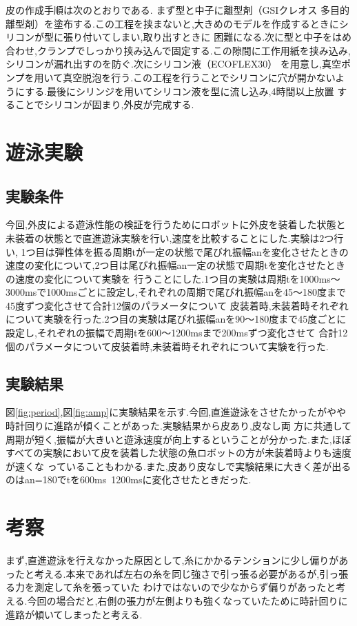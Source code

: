 \documentclass{jarticle}
\begin{document}
皮の作成手順は次のとおりである.
まず型と中子に離型剤（GSIクレオス 多目的離型剤）を塗布する.この工程を挟まないと,大きめのモデルを作成するときにシリコンが型に張り付いてしまい,取り出すときに
困難になる.次に型と中子をはめ合わせ,クランプでしっかり挟み込んで固定する.この隙間に工作用紙を挟み込み,シリコンが漏れ出すのを防ぐ.次にシリコン液（ECOFLEX30）
を用意し,真空ポンプを用いて真空脱泡を行う.この工程を行うことでシリコンに穴が開かないようにする.最後にシリンジを用いてシリコン液を型に流し込み,4時間以上放置
することでシリコンが固まり,外皮が完成する.

\section{遊泳実験}
\subsection{実験条件}
今回,外皮による遊泳性能の検証を行うためにロボットに外皮を装着した状態と未装着の状態とで直進遊泳実験を行い,速度を比較することにした.実験は2つ行い,
1つ目は弾性体を振る周期tが一定の状態で尾びれ振幅anを変化させたときの速度の変化について,2つ目は尾びれ振幅an一定の状態で周期tを変化させたときの速度の変化について実験を
行うことにした.1つ目の実験は周期tを1000ms～3000msで1000msごとに設定し,それぞれの周期で尾びれ振幅anを45～180度まで45度ずつ変化させて合計12個のパラメータについて
皮装着時,未装着時それぞれについて実験を行った.2つ目の実験は尾びれ振幅anを90～180度まで45度ごとに設定し,それぞれの振幅で周期tを600～1200msまで200msずつ変化させて
合計12個のパラメータについて皮装着時,未装着時それぞれについて実験を行った.

\subsection{実験結果}
図\ref{fig:period},図\ref{fig:amp}に実験結果を示す.今回,直進遊泳をさせたかったがやや時計回りに進路が傾くことがあった.実験結果から皮あり,皮なし両
方に共通して周期が短く,振幅が大きいと遊泳速度が向上するということが分かった.また,ほぼすべての実験において皮を装着した状態の魚ロボットの方が未装着時よりも速度が速くな
っていることもわかる.また,皮あり皮なしで実験結果に大きく差が出るのはan=180でtを600ms~1200msに変化させたときだった.

\section{考察}
まず,直進遊泳を行えなかった原因として,糸にかかるテンションに少し偏りがあったと考える.本来であれば左右の糸を同じ強さで引っ張る必要があるが,引っ張る力を測定して糸を張っていた
わけではないので少なからず偏りがあったと考える.今回の場合だと,右側の張力が左側よりも強くなっていたために時計回りに進路が傾いてしまったと考える.
\end{document}
